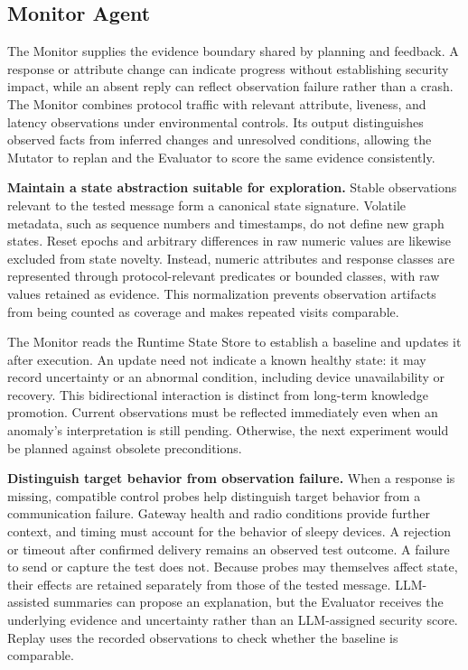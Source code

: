 \documentclass[10pt,journal,compsoc]{IEEEtran}
\newcommand{\parab}[1]{\vspace{0.04in}\noindent\textbf{#1}}
\begin{document}
\subsection{Monitor Agent}\label{sec:monitor}
The Monitor supplies the evidence boundary shared by planning and feedback. A response or attribute change can indicate progress without establishing security impact, while an absent reply can reflect observation failure rather than a crash. The Monitor combines protocol traffic with relevant attribute, liveness, and latency observations under environmental controls. Its output distinguishes observed facts from inferred changes and unresolved conditions, allowing the Mutator to replan and the Evaluator to score the same evidence consistently.

\parab{Maintain a state abstraction suitable for exploration.}
Stable observations relevant to the tested message form a canonical state signature. Volatile metadata, such as sequence numbers and timestamps, do not define new graph states. Reset epochs and arbitrary differences in raw numeric values are likewise excluded from state novelty. Instead, numeric attributes and response classes are represented through protocol-relevant predicates or bounded classes, with raw values retained as evidence. This normalization prevents observation artifacts from being counted as coverage and makes repeated visits comparable.

The Monitor reads the Runtime State Store to establish a baseline and updates it after execution. An update need not indicate a known healthy state: it may record uncertainty or an abnormal condition, including device unavailability or recovery. This bidirectional interaction is distinct from long-term knowledge promotion. Current observations must be reflected immediately even when an anomaly's interpretation is still pending. Otherwise, the next experiment would be planned against obsolete preconditions.

\parab{Distinguish target behavior from observation failure.}
When a response is missing, compatible control probes help distinguish target behavior from a communication failure. Gateway health and radio conditions provide further context, and timing must account for the behavior of sleepy devices. A rejection or timeout after confirmed delivery remains an observed test outcome. A failure to send or capture the test does not. Because probes may themselves affect state, their effects are retained separately from those of the tested message. LLM-assisted summaries can propose an explanation, but the Evaluator receives the underlying evidence and uncertainty rather than an LLM-assigned security score. Replay uses the recorded observations to check whether the baseline is comparable.
\end{document}
